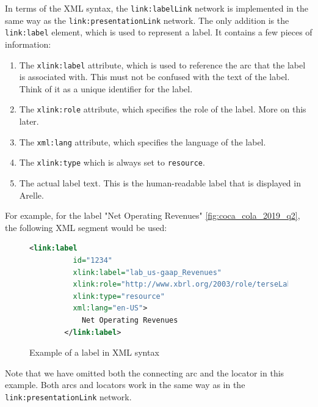 In terms of the XML syntax, the \texttt{link:labelLink} network is implemented in the same way as the \texttt{link:presentationLink} network.
The only addition is the \texttt{link:label} element, which is used to represent a label.
It contains a few pieces of information:

\begin{enumerate}
    \item The \texttt{xlink:label} attribute, which is used to reference the arc that the label is associated with.
    This must not be confused with the text of the label.
    Think of it as a unique identifier for the label.
    \item The \texttt{xlink:role} attribute, which specifies the role of the label. More on this later.
    \item The \texttt{xml:lang} attribute, which specifies the language of the label.
    \item The \texttt{xlink:type} which is always set to \texttt{resource}.
    \item The actual label text. This is the human-readable label that is displayed in Arelle.
\end{enumerate}

For example, for the label "Net Operating Revenues" \ref{fig:coca_cola_2019_q2}, the following XML segment would be used:

\begin{figure}[H]
    \begin{lstlisting}[language=XML]
        <link:label 
          id="1234" 
          xlink:label="lab_us-gaap_Revenues" 
          xlink:role="http://www.xbrl.org/2003/role/terseLabel" 
          xlink:type="resource" 
          xml:lang="en-US">
            Net Operating Revenues
        </link:label>

    \end{lstlisting}
    \caption{Example of a label in XML syntax}
    \label{fig:example_label_xml}
\end{figure}

Note that we have omitted both the connecting arc and the locator in this example.
Both arcs and locators work in the same way as in the \texttt{link:presentationLink} network.


